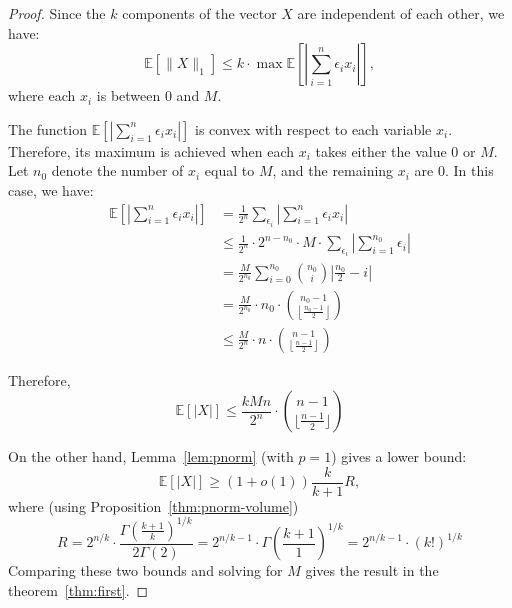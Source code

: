 \documentclass[10pt,a4paper]{amsart}
\begin{document}
\begin{proof}
Since the $k$ components of the vector $X$ are independent of each other, we have:
\[
\mathbb{E}[\|X\|_1] \leq k \cdot \max \mathbb{E}\left[\left|\sum_{i=1}^n \epsilon_i x_i\right|\right],
\]
where each $x_i$ is between $0$ and $M$.

The function $\mathbb{E}\left[\left|\sum_{i=1}^n \epsilon_i x_i\right|\right]$ is convex with respect to each variable $x_i$. Therefore, its maximum is achieved when each $x_i$ takes either the value $0$ or $M$. Let $n_0$ denote the number of $x_i$ equal to $M$, and the remaining $x_i$ are $0$. In this case, we have:
\begin{align*}
    \mathbb{E}\left[\left|\sum_{i=1}^n \epsilon_i x_i\right|\right] &= \frac{1}{2^n} \sum_{\epsilon_i} \left|\sum_{i=1}^n \epsilon_i x_i\right| \\
    &\leq \frac{1}{2^n} \cdot 2^{n-n_0} \cdot M \cdot \sum_{\epsilon_i} \left|\sum_{i=1}^{n_0} \epsilon_i\right| \\
    &= \frac{M}{2^{n_0}} \sum_{i=0}^{n_0} \binom{n_0}{i} \left| \frac{n_0}{2} - i \right| \\
    &= \frac{M}{2^{n_0}} \cdot n_0 \cdot \binom{n_0-1}{\left\lfloor \frac{n_0-1}{2} \right\rfloor} \\
    &\leq \frac{M}{2^n} \cdot n \cdot \binom{n-1}{\left\lfloor \frac{n-1}{2} \right\rfloor}
\end{align*}

Therefore,
\begin{equation}
\mathbb{E}[|X|]\le \frac{kMn}{2^n}\cdot \binom{n-1}{\lfloor\frac{n-1}{2}\rfloor}
\end{equation}

On the other hand, Lemma~\ref{lem:pnorm} (with $p=1$) gives a lower bound:
\begin{equation}
\mathbb{E}[|X|] \geq (1+o(1)) \frac{k}{k+1} R,
\end{equation}
where (using Proposition~\ref{thm:pnorm-volume})
\[
R=2^{n/k}\cdot \frac{\Gamma \left(\frac{k+1}{k}\right)^{1/k}}{2\Gamma (2)}=2^{n/k-1}\cdot \Gamma \left(\frac{k+1}{1}\right)^{1/k}=2^{n/k-1}\cdot \left(k!\right)^{1/k}
\]
Comparing these two bounds and solving for $M$ gives the result in the theorem~\ref{thm:first}.
\end{proof}
\end{document}
